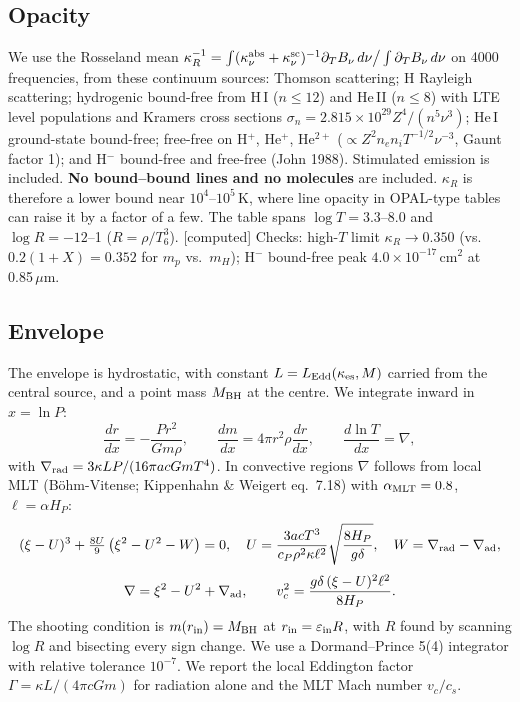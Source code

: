 \documentclass[11pt]{article}
\newcommand{\kes}{\kappa_{\rm es}}
\newcommand{\status}[1]{\textsf{\small\textcolor{black!60}{[#1]}}}
\begin{document}
\subsection{Opacity}
We use the Rosseland mean
$\kappa_R^{-1}=\int(\kappa_\nu^{\rm abs}+\kappa_\nu^{\rm sc})^{-1}\partial_TB_\nu\,d\nu\big/\int\partial_TB_\nu\,d\nu$
on 4000 frequencies, from these continuum sources: Thomson scattering; H Rayleigh scattering; hydrogenic
bound-free from H\,I ($n\le12$) and He\,II ($n\le8$) with LTE level populations and Kramers cross sections
$\sigma_n=2.815\times10^{29}Z^4/(n^5\nu^3)$; He\,I ground-state bound-free; free-free on H$^+$, He$^+$, He$^{2+}$
($\propto Z^2n_en_iT^{-1/2}\nu^{-3}$, Gaunt factor 1); and H$^-$ bound-free and free-free (John 1988).
Stimulated emission is included. \textbf{No bound--bound lines and no molecules} are included. $\kappa_R$ is
therefore a lower bound near $10^4$--$10^5$\,K, where line opacity in OPAL-type tables can raise it by a factor of a few.
The table spans $\log T=3.3$--8.0 and $\log R=-12$--1 ($R=\rho/T_6^3$). \status{computed} Checks: high-$T$ limit
$\kappa_R\to0.350$ (vs.\ $0.2(1+X)=0.352$ for $m_p$ vs.\ $m_H$); H$^-$ bound-free peak
$4.0\times10^{-17}$\,cm$^2$ at 0.85\,$\mu$m.

\subsection{Envelope}
The envelope is hydrostatic, with constant $L=L_{\rm Edd}(\kes,M)$ carried from the central source, and a
point mass $M_{\rm BH}$ at the centre. We integrate inward in $x=\ln P$:
\begin{equation}
\frac{dr}{dx}=-\frac{Pr^2}{Gm\rho},\qquad \frac{dm}{dx}=4\pi r^2\rho\frac{dr}{dx},\qquad \frac{d\ln T}{dx}=\nabla,
\end{equation}
with $\nabla_{\rm rad}=3\kappa LP/(16\pi acGmT^4)$. In convective regions $\nabla$ follows from local MLT
(Böhm-Vitense; Kippenhahn \& Weigert eq.~7.18) with $\alpha_{\rm MLT}=0.8$, $\ell=\alpha H_P$:
\begin{equation}
(\xi-U)^3+\tfrac{8U}{9}\left(\xi^2-U^2-W\right)=0,\quad
U=\frac{3acT^3}{c_P\rho^2\kappa\ell^2}\sqrt{\frac{8H_P}{g\delta}},\quad W=\nabla_{\rm rad}-\nabla_{\rm ad},
\end{equation}
\begin{equation}
\nabla=\xi^2-U^2+\nabla_{\rm ad},\qquad v_c^2=\frac{g\delta\,(\xi-U)^2\ell^2}{8H_P}.
\end{equation}
The shooting condition is $m(r_{\rm in})=M_{\rm BH}$ at $r_{\rm in}=\varepsilon_{\rm in}R$, with $R$ found by scanning
$\log R$ and bisecting every sign change. We use a Dormand--Prince 5(4) integrator with relative tolerance $10^{-7}$.
We report the local Eddington factor $\Gamma=\kappa L/(4\pi cGm)$ for radiation alone and the MLT Mach number $v_c/c_s$.
\end{document}
